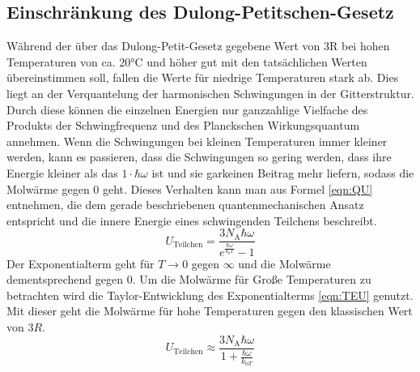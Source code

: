 \documentclass[titlepage = firstcover]{scrartcl}
\begin{document}
        \subsection{Einschränkung des Dulong-Petitschen-Gesetz}
            Während der über das Dulong-Petit-Gesetz gegebene Wert von 3R bei hohen Temperaturen von ca. 20°C und höher gut mit den tatsächlichen Werten übereinstimmen soll,
            fallen die Werte für niedrige Temperaturen stark ab. Dies liegt an der Verquantelung der harmonischen Schwingungen in der Gitterstruktur. 
            Durch diese können die einzelnen Energien nur ganzzahlige Vielfache des Produkts der Schwingfrequenz und des Planckschen Wirkungsquantum annehmen. Wenn 
            die Schwingungen bei kleinen Temperaturen immer kleiner werden, kann es passieren, dass die Schwingungen so gering werden, dass ihre Energie
            kleiner als das $1 \cdot \hbar \omega$ ist und sie garkeinen Beitrag mehr liefern, sodass die Molwärme gegen 0 geht. Dieses Verhalten kann man aus Formel
            \eqref{eqn:QU} entnehmen, die dem gerade beschriebenen quantenmechanischen Ansatz entspricht und die innere Energie eines schwingenden Teilchens beschreibt.
            \begin{equation}
              U_{\text{Teilchen}} = \frac{3 N_{\text{A}} \hbar \omega}{e^{\frac{\hbar \omega}{k_bT}}-1}
              \label{eqn:QU}
            \end{equation} 
            Der Exponentialterm geht für $T \rightarrow 0$ gegen $\infty$ und die Molwärme dementsprechend gegen 0. Um die Molwärme für Große Temperaturen
            zu betrachten wird die Taylor-Entwicklung des Exponentialterms \eqref{eqn:TEU} genutzt. Mit dieser geht die Molwärme für hohe Temperaturen gegen 
            den klassischen Wert von $3R$.
            \begin{equation}
              U_{\text{Teilchen}} \approx \frac{3 N_{\text{A}} \hbar \omega}{1 + \frac{\hbar \omega}{k_{\text{b}T}}}
              \label{eqn:TEU}
            \end{equation} 

    \newpage
\end{document}
